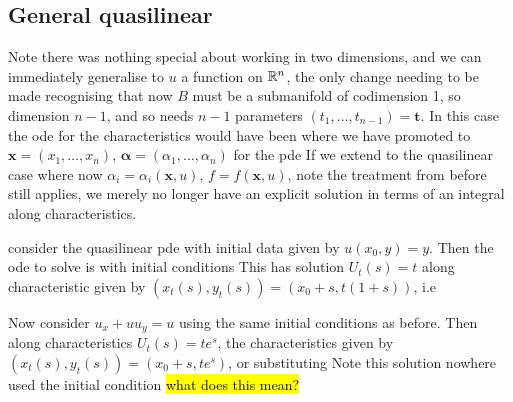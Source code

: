 \documentclass{article}
\begin{document}
\subsection{General quasilinear}
Note there was nothing special about working in two dimensions, and we can immediately generalise to $u$ a function on $\mathbb{R}^n$, the only change needing to be made recognising that now $B$ must be a submanifold of codimension 1, so dimension $n-1$, and so needs $n-1$ parameters $(t_1, \dots, t_{n-1}) = \bm{t}$. In this case the ode for the characteristics would have been 
where we have promoted to $\bm{x} = (x_1, \dots , x_n)$, $\bm{\alpha} = (\alpha_1 , \dots , \alpha_n)$ for the pde
If we extend to the quasilinear case where now $\alpha_i = \alpha_i(\bm{x},u), \, f=f(\bm{x},u)$, note the treatment from before still applies, we merely no longer have an explicit solution in terms of an integral along characteristics. 
\begin{example}
consider the quasilinear pde
with initial data given by $u(x_0,y) = y$. Then the ode to solve is 
with initial conditions 
This has solution $U_t(s) = t$ along characteristic given by $(x_t(s),y_t(s)) = (x_0 + s, t(1+s))$, i.e
\end{example}

\begin{example}
Now consider $u_x + uu_y = u$ using the same initial conditions as before. Then along characteristics $U_t(s) = te^s$, the characteristics given by $(x_t(s),y_t(s)) = (x_0 + s, te^s)$, or substituting 
Note this solution nowhere used the initial condition \hl{what does this mean?}
\end{example}
\end{document}
